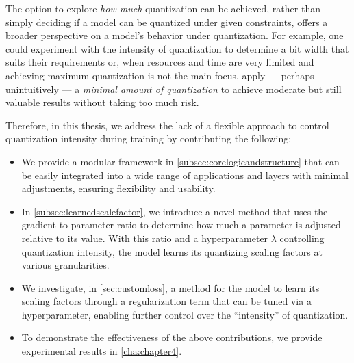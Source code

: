The option to explore \textit{how much} quantization can be achieved, 
rather than simply deciding if a model can be quantized under given constraints, 
offers a broader perspective on a model's behavior under quantization.
 For example, one could experiment with the intensity of quantization to determine 
 a bit width that suits their requirements or, 
 when resources and time are very limited and achieving maximum quantization is not the main focus, 
 apply — perhaps unintuitively — 
 a \textit{minimal amount of quantization} 
 to achieve moderate but still valuable results 
 without taking too much risk.

Therefore, in this thesis, we address the lack of a flexible approach 
to control quantization intensity during training 
by contributing the following:
\begin{itemize}
    \item We provide a modular framework in \cref{subsec:corelogicandstructure} that can be easily integrated into a wide range of applications and layers
    with minimal adjustments, ensuring flexibility and usability.
    \item In \cref{subsec:learnedscalefactor}, we introduce a novel method that uses the gradient-to-parameter ratio to determine how much a parameter is adjusted relative to its value. With this ratio and a hyperparameter 
    \( \lambda \) controlling quantization intensity, the model learns its quantizing scaling factors at various granularities.
    \item We investigate, in \cref{sec:customloss}, a method for the model to learn its scaling factors through a regularization term that can be tuned via a hyperparameter, enabling further control over the “intensity” of quantization.
    \item To demonstrate the effectiveness of the above contributions, we provide experimental results in \cref{cha:chapter4}.
\end{itemize}
 